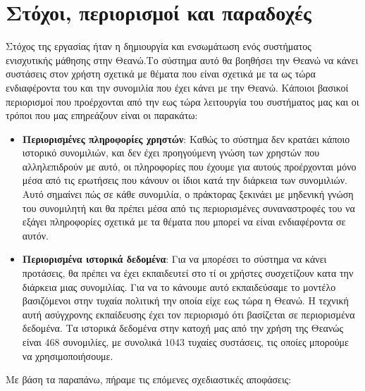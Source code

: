 \section{Στόχοι, περιορισμοί και παραδοχές}

Στόχος της εργασίας ήταν η δημιουργία και ενσωμάτωση ενός συστήματος ενισχυτικής μάθησης στην Θεανώ.Το σύστημα αυτό θα βοηθήσει την Θεανώ να κάνει συστάσεις στον χρήστη σχετικά με θέματα που είναι σχετικά με τα ως τώρα ενδιαφέροντα του και την συνομιλία που έχει κάνει με την Θεανώ. Κάποιοι βασικοί περιορισμοί που προέρχονται από την εως τώρα λειτουργία του συστήματος μας και οι τρόποι που μας επηρεάζουν είναι οι παρακάτω:

\begin{itemize}
    \item \textbf{Περιορισμένες πληροφορίες χρηστών}: Καθώς το σύστημα δεν κρατάει κάποιο ιστορικό συνομιλιών, και δεν έχει προηγούμενη γνώση των χρηστών που αλληλεπιδρούν με αυτό, οι πληροφορίες που έχουμε για αυτούς προέρχονται μόνο μέσα από τις ερωτήσεις που κάνουν οι ίδιοι κατά την διάρκεια των συνομιλιών. Αυτό σημαίνει πώς σε κάθε συνομιλία, ο πράκτορας ξεκινάει με μηδενική γνώση του συνομιλητή και θα πρέπει μέσα από τις περιορισμένες συναναστροφές του να εξάγει πληροφορίες σχετικά με τα θέματα που μπορεί να είναι ενδιαφέροντα σε αυτόν.
    \item \textbf{Περιορισμένα ιστορικά δεδομένα}: Για να μπορέσει το σύστημα να κάνει προτάσεις, θα πρέπει να έχει εκπαιδευτεί στο τί οι χρήστες συσχετίζουν κατα την διάρκεια μιας συνομιλίας. Για να το κάνουμε αυτό εκπαιδεύσαμε το μοντέλο βασιζόμενοι στην τυχαία πολιτική την οποία είχε εως τώρα η Θεανώ. Η τεχνική αυτή ασύγχρονης εκπαίδευσης έχει τον περιορισμό ότι βασίζεται σε περιορισμένα δεδομένα. Τα ιστορικά δεδομένα στην κατοχή μας από την χρήση της Θεανώς είναι $468$ συνομιλίες, με συνολικά $1043$ τυχαίες συστάσεις, τις οποίες μπορούμε να χρησιμοποιήσουμε.
\end{itemize}

Με βάση τα παραπάνω, πήραμε τις επόμενες σχεδιαστικές αποφάσεις:

